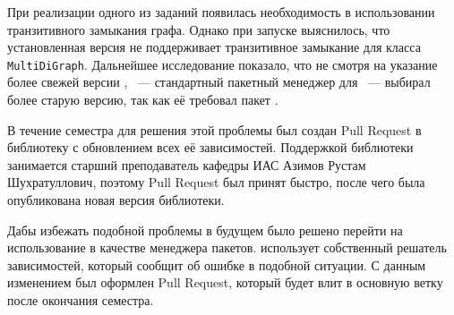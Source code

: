 При реализации одного из заданий появилась необходимость в использовании транзитивного замыкания графа.
Однако при запуске выяснилось, что установленная версия \networkx{} не поддерживает транзитивное замыкание для класса \texttt{MultiDiGraph}.
Дальнейшее исследование показало, что не смотря на указание более свежей версии \networkx{}, \pip{}~--- стандартный пакетный менеджер для \python{}~--- выбирал более старую версию, так как её требовал пакет \cfpqdata{}.

В течение семестра для решения этой проблемы был создан Pull Request в библиотеку \cfpqdata{} с обновлением всех её зависимостей.
Поддержкой библиотеки занимается старший преподаватель кафедры ИАС Азимов Рустам Шухратуллович, поэтому Pull Request был принят быстро, после чего была опубликована новая версия библиотеки.

Дабы избежать подобной проблемы в будущем было решено перейти на использование \poetry{} в качестве менеджера пакетов.
\poetry{} использует собственный решатель зависимостей, который сообщит об ошибке в подобной ситуации.
С данным изменением был оформлен Pull Request, который будет влит в основную ветку после окончания семестра.

